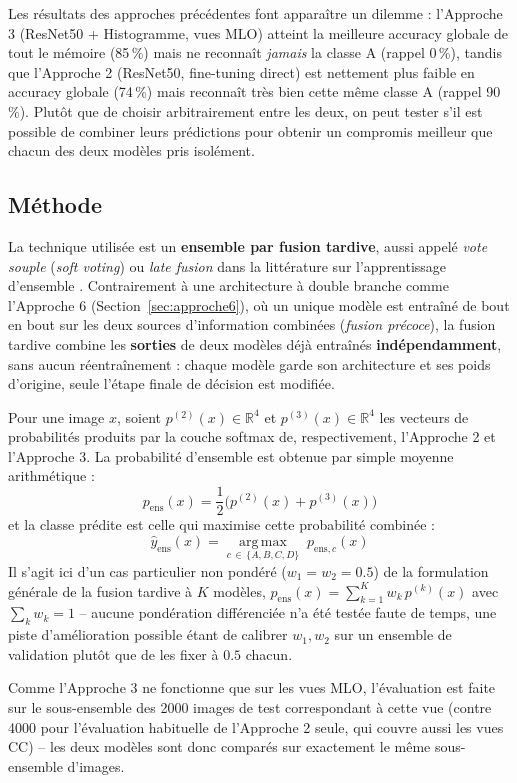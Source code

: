 \documentclass[12pt,a4paper]{report}
\begin{document}
Les résultats des approches précédentes font apparaître un dilemme : l'Approche 3
(ResNet50 + Histogramme, vues MLO) atteint la meilleure accuracy globale de tout
le mémoire (85\,\%) mais ne reconnaît \emph{jamais} la classe A (rappel 0\,\%),
tandis que l'Approche 2 (ResNet50, fine-tuning direct) est nettement plus faible
en accuracy globale (74\,\%) mais reconnaît très bien cette même classe A
(rappel 90\,\%). Plutôt que de choisir arbitrairement entre les deux, on peut
tester s'il est possible de combiner leurs prédictions pour obtenir un
compromis meilleur que chacun des deux modèles pris isolément.

\subsection{Méthode}

La technique utilisée est un \textbf{ensemble par fusion tardive}, aussi appelé
\emph{vote souple} (\emph{soft voting}) ou \emph{late fusion} dans la littérature
sur l'apprentissage d'ensemble \cite{ref_dietterich}. Contrairement à une
architecture à double branche comme l'Approche 6 (Section~\ref{sec:approche6}),
où un unique modèle est entraîné de bout en bout sur les deux sources
d'information combinées (\emph{fusion précoce}), la fusion tardive combine les
\textbf{sorties} de deux modèles déjà entraînés \textbf{indépendamment}, sans
aucun réentraînement : chaque modèle garde son architecture et ses poids
d'origine, seule l'étape finale de décision est modifiée.

Pour une image $x$, soient $p^{(2)}(x) \in \mathbb{R}^4$ et $p^{(3)}(x) \in
\mathbb{R}^4$ les vecteurs de probabilités produits par la couche softmax de,
respectivement, l'Approche 2 et l'Approche 3. La probabilité d'ensemble est
obtenue par simple moyenne arithmétique :
\[
  p_{\text{ens}}(x) = \frac{1}{2}\Big(p^{(2)}(x) + p^{(3)}(x)\Big)
\]
et la classe prédite est celle qui maximise cette probabilité combinée :
\[
  \hat{y}_{\text{ens}}(x) = \operatorname*{arg\,max}_{c \,\in\, \{A,B,C,D\}} \; p_{\text{ens},c}(x)
\]
Il s'agit ici d'un cas particulier non pondéré ($w_1 = w_2 = 0.5$) de la
formulation générale de la fusion tardive à $K$ modèles,
$p_{\text{ens}}(x) = \sum_{k=1}^{K} w_k\, p^{(k)}(x)$ avec $\sum_k w_k = 1$ --
aucune pondération différenciée n'a été testée faute de temps, une piste
d'amélioration possible étant de calibrer $w_1, w_2$ sur un ensemble de
validation plutôt que de les fixer à $0.5$ chacun.

Comme l'Approche 3 ne fonctionne que sur les vues MLO, l'évaluation est faite
sur le sous-ensemble des 2000 images de test correspondant à cette vue (contre
4000 pour l'évaluation habituelle de l'Approche 2 seule, qui couvre aussi les
vues CC) -- les deux modèles sont donc comparés sur exactement le même
sous-ensemble d'images.
\end{document}
